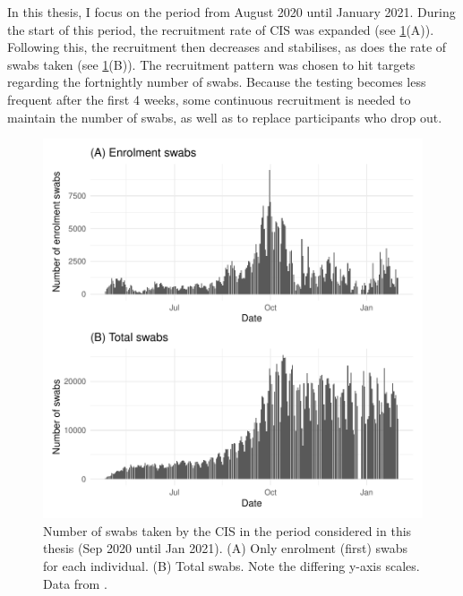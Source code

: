 \documentclass[thesis.tex]{subfiles}
\begin{document}
In this thesis, I focus on the period from August 2020 until January 2021.
During the start of this period, the recruitment rate of CIS was expanded (see \cref{biology-data:fig:CIS-recruitment}(A)).
Following this, the recruitment then decreases and stabilises, as does the rate of swabs taken (see \cref{biology-data:fig:CIS-recruitment}(B)).
The recruitment pattern was chosen to hit targets regarding the fortnightly number of swabs.
Because the testing becomes less frequent after the first 4 weeks, some continuous recruitment is needed to maintain the number of swabs, as well as to replace participants who drop out.


\begin{figure}
  \centering \includegraphics{biology-data/CIS-recruitment}
  \caption[CIS swab numbers]{%
    Number of swabs taken by the CIS in the period considered in this thesis (Sep 2020 until Jan 2021).
    (A) Only enrolment (\ie first) swabs for each individual.
    (B) Total swabs.
    Note the differing y-axis scales.
    Data from \textcite{CIStechData}.
  }
  \label{biology-data:fig:CIS-recruitment}
\end{figure}
\end{document}
